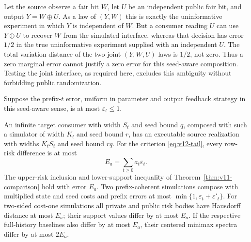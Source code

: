 \begin{example}
\label{ex:v12-seedinterface}
Let the source observe a fair bit $W$, let $U$ be an independent public
fair bit, and output $Y=W\mathbin{\oplus}U$. As a law of $(Y,W)$ this
is exactly the uninformative experiment in which $Y$ is independent of
$W$. But a consumer reading $U$ can use $Y\mathbin{\oplus}U$ to recover
$W$ from the simulated interface, whereas that decision has error $1/2$
in the true uninformative experiment supplied with an independent $U$.
The total variation distance of the two joint $(Y,W,U)$ laws is $1/2$,
not zero. Thus a zero marginal error cannot justify a zero error for
this seed-aware composition. Testing the joint interface, as required
here, excludes this ambiguity without forbidding public randomization.
\end{example}

Suppose the prefix-$t$ error, uniform in parameter and output feedback
strategy in this seed-aware sense, is at most $\varepsilon_t\le1$.

\begin{theorem}
\label{thm:v12-transport}
An infinite target consumer with width $S_t$ and seed bound $q$, composed
with such a simulator of width $K_t$ and seed bound $r$, has an executable
source realization with widths $K_tS_t$ and seed bound $rq$. For the
criterion \eqref{eq:v12-tail}, every row-risk difference is at most
\begin{equation}
 E_a=\sum_{t\ge0}a_t\varepsilon_t.
 \label{eq:v12-weighted-error}
\end{equation}
The upper-risk inclusion and lower-support inequality of
Theorem~\ref{thm:v11-comparison} hold with error $E_a$. Two prefix-coherent
simulations compose with multiplied state and seed costs and prefix
errors at most $\min\{1,\varepsilon_t+\varepsilon'_t\}$.
For two-sided cost-one simulations all private and public risk bodies
have Hausdorff distance at most $E_a$; their support values differ by at
most $E_a$. If the respective full-history baselines also differ by at
most $E_a$, their centered minimax spectra differ by at most $2E_a$.
\end{theorem}

